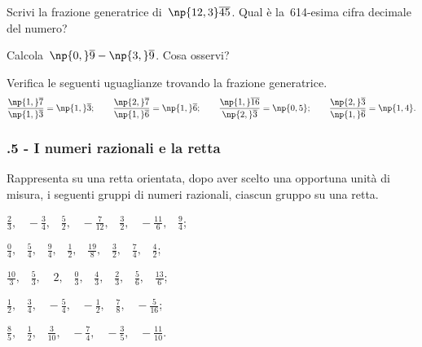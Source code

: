 \begin{esercizio}
\label{ese:3.30}
Scrivi la frazione generatrice di~$\np{12,3}\overline{45}$. Qual è la~614-esima cifra decimale del numero?
\end{esercizio}

\begin{esercizio}
\label{ese:3.31}
Calcola~$\np{0,}\overline{9}-\np{3,}\overline{9}$. Cosa osservi?
\end{esercizio}

\begin{esercizio}
\label{ese:3.32}
Verifica le seguenti uguaglianze trovando la frazione generatrice.
\[\frac{\np{1,}\overline{7}}{\np{1,}\overline{3}}=\np{1,}\overline{3};\qquad%
\frac{\np{2,}\overline{7}}{\np{1,}\overline{6}}=\np{1,}\overline{6};\qquad%
\frac{\np{1,}\overline{16}}{\np{2,}\overline{3}}=\np{0,5};\qquad%
\frac{\np{2,}\overline{3}}{\np{1,}\overline{6}}=\np{1,4}.\]
\end{esercizio}

\subsubsection*{\thechapter.5 - I numeri razionali e la retta}

\begin{esercizio}
 \label{ese:3.33}
Rappresenta su una retta orientata, dopo aver scelto una opportuna unità di misura,
i seguenti gruppi di numeri razionali, ciascun gruppo su una retta.
 \begin{enumeratea}
\spazielenx
 \item $\displaystyle{\frac{2}{3}\text{,}\quad-\frac{3}{4}\text{,}\quad\frac{5}{2}\text{,}\quad-\frac{7}{12}\text{,}\quad\frac{3}{2}\text{,}\quad%
-\frac{11}{6}\text{,}\quad\frac{9}{4}}$;
 \item $\displaystyle{\frac{0}{4}\text{,}\quad\frac{5}{4}\text{,}\quad\frac{9}{4}\text{,}\quad\frac{1}{2}\text{,}\quad\frac{19}{8}\text{,}\quad\frac{3}{2}%
\text{,}\quad\frac{7}{4}\text{,}\quad\frac{4}{2}}$;
 \item $\displaystyle{\frac{10}{3}\text{,}\quad\frac{5}{3}\text{,}\quad~2\text{,}\quad\frac{0}{3}\text{,}\quad\frac{4}{3}\text{,}\quad\frac{2}{3}%
\text{,}\quad\frac{5}{6}\text{,}\quad\frac{13}{6}}$;
 \item $\displaystyle{\frac{1}{2}\text{,}\quad\frac{3}{4}\text{,}\quad-\frac{5}{4}\text{,}\quad-\frac{1}{2}\text{,}\quad\frac{7}{8}\text{,}%
\quad-\frac{5}{16}}$;
\item $\displaystyle{\frac{8}{5}\text{,}\quad\frac{1}{2}\text{,}\quad\frac{3}{10}\text{,}\quad-\frac{7}{4}\text{,}\quad-\frac{3}{5}%
\text{,}\quad-\frac{11}{10}}$.
 \end{enumeratea}
\end{esercizio}

